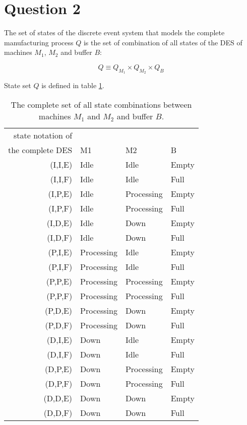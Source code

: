 \section{Question 2}

The set of states of the discrete event system that models the complete
manufacturing process $Q$ is the set of combination of all states of the DES of
machines $M_1$, $M_2$ and buffer $B$:

$$Q \equiv Q_{M_1} \times Q_{M_2} \times Q_{B}$$

State set $Q$ is defined in table \ref{tbl:04.02_all_states}.


\begin{table}[H]\centering
    \begin{tabular}{r|lll}
    state notation of \\ the complete DES & M1         & M2         & B     \\ \hline
    (I,I,E)                            & Idle       & Idle       & Empty \\
    (I,I,F)                            & Idle       & Idle       & Full  \\
    (I,P,E)                            & Idle       & Processing & Empty \\
    (I,P,F)                            & Idle       & Processing & Full  \\
    (I,D,E)                            & Idle       & Down       & Empty \\
    (I,D,F)                            & Idle       & Down       & Full  \\
    (P,I,E)                            & Processing & Idle       & Empty \\
    (P,I,F)                            & Processing & Idle       & Full  \\
    (P,P,E)                            & Processing & Processing & Empty \\
    (P,P,F)                            & Processing & Processing & Full  \\
    (P,D,E)                            & Processing & Down       & Empty \\
    (P,D,F)                            & Processing & Down       & Full  \\
    (D,I,E)                            & Down       & Idle       & Empty \\
    (D,I,F)                            & Down       & Idle       & Full  \\
    (D,P,E)                            & Down       & Processing & Empty \\
    (D,P,F)                            & Down       & Processing & Full  \\
    (D,D,E)                            & Down       & Down       & Empty \\
    (D,D,F)                            & Down       & Down       & Full  \\
    \end{tabular}
    \caption{The complete set of all state combinations between machines $M_1$
      and $M_2$ and buffer $B$.}
    \label{tbl:04.02_all_states}
\end{table}

